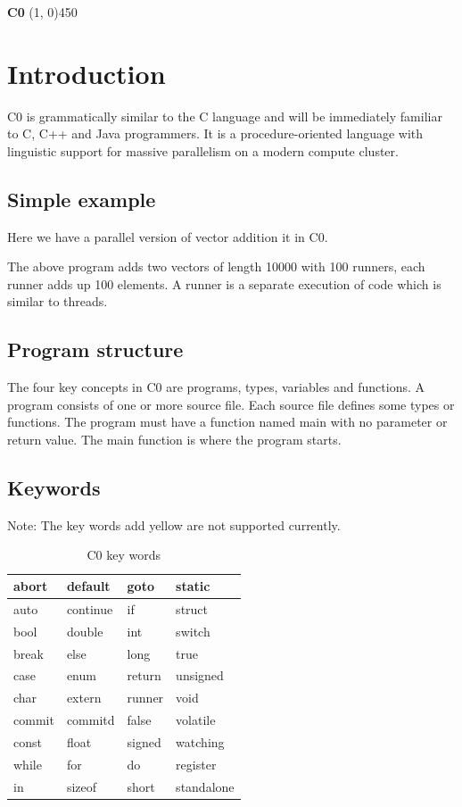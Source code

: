 \documentclass[a4paper]{article}
\begin{document}
\begin{flushleft}
\Large \textbf{C0}
\line(1, 0){450}
\end{flushleft}

\section{Introduction}
C0 is grammatically similar to the C language and will be immediately familiar to C, C++ and Java programmers. It is a procedure-oriented language with linguistic support for massive parallelism on a modern compute cluster. 

\subsection{Simple example}
Here we have a parallel version of vector addition it in C0.

The above program adds two vectors of length 10000 with 100 runners, each runner adds up 100 elements. A runner is a separate execution of code which is similar to threads.

\subsection{Program structure}
The four key concepts in C0 are programs, types, variables and functions. A program consists of one or more source file. Each source file defines some types or functions. The program must have a function named main with no parameter or return value. The main function is where the program starts.

\subsection{Keywords}
Note: The key words add yellow are not supported currently.

\begin{table}[htbp]
\centering
\caption{C0 key words}
\begin{tabular}{|l|l|l|l|}
\hline
abort & default & goto & static\\
\hline
auto & continue & if & struct\\
\hline
bool & double & int & switch\\
\hline
break & else & long & true\\
\hline
case & enum & return & unsigned\\
\hline
char & extern & runner & void\\
\hline
commit & commitd & false & volatile\\
\hline
const & float & signed & watching\\
\hline
while & for & do & register\\
\hline
in & sizeof & short & standalone\\
\hline
\end{tabular}
\label{table:key-words}
\end{table}
\end{document}
